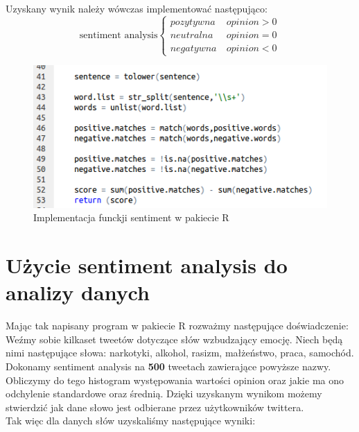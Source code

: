 \documentclass[12pt,a4paper]{report}
\begin{document}
Uzyskany wynik należy wówczas implementować następująco: \\
\[\mbox{sentiment analysis} \left \lbrace \begin{array}{cl}
pozytywna &~ opinion > 0 \\
neutralna &~ opinion=0 \\
negatywna &~ opinion < 0
\end{array} \right. \]
\begin{figure}[H]
\begin{center}
\includegraphics[scale=0.5]{pictures/Code6.png}
\caption{Implementacja funckji sentiment w pakiecie R}
\end{center}
\end{figure}


\section[Użycie sentiment analysis do analizy danych]{Użycie sentiment analysis do analizy danych}
Mając tak napisany program w pakiecie R rozważmy następujące doświadczenie: Weźmy sobie kilkaset tweetów dotyczące słów wzbudzający emocję. Niech będą nimi następujące słowa: narkotyki, alkohol, rasizm, małżeństwo, praca, samochód. Dokonamy sentiment analysis na  \textbf{500} tweetach zawierające powyższe nazwy. Obliczymy do tego histogram występowania wartości opinion oraz jakie ma ono odchylenie standardowe oraz średnią. Dzięki uzyskanym wynikom możemy stwierdzić jak dane słowo jest odbierane przez użytkowników twittera.\\
Tak więc dla danych słów uzyskaliśmy następujące wyniki: \\
\end{document}
